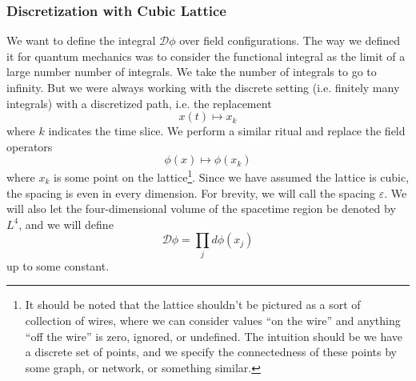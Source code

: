 \subsubsection{Discretization with Cubic Lattice} We want to
define the integral $\mathcal{D}\phi$ over field
configurations. The way we defined it for quantum mechanics was
to consider the functional integral as the limit of a large
number number of integrals. We take the number of integrals to go
to infinity. But we were always working with the discrete setting
(i.e. finitely many integrals) with a discretized path, i.e. the
replacement 
\begin{equation}%
x(t)\longmapsto x_{k}
\end{equation}
where $k$ indicates the time slice. We perform a similar ritual
and replace the field operators
\begin{equation}%
\phi(x)\longmapsto\phi(x_k)
\end{equation}
where $x_k$ is some point on the lattice\footnote{It should be
  noted that the lattice shouldn't be pictured as a sort of
  collection of wires, where we can consider values ``on the
  wire'' and anything ``off the wire'' is zero, ignored, or
  undefined. The intuition should be we have a discrete set of
  points, and we specify the connectedness of these points by
  some graph, or network, or something similar.}. Since we have
assumed the lattice is cubic, the spacing is even in every
dimension. For brevity, we will call the spacing
$\varepsilon$. We will also let the four-dimensional volume of
the spacetime region be denoted by $L^4$, and we will define
\begin{equation}%
\mathcal{D}\phi = \prod_{j}d\phi(x_j)
\end{equation}
up to some constant.

